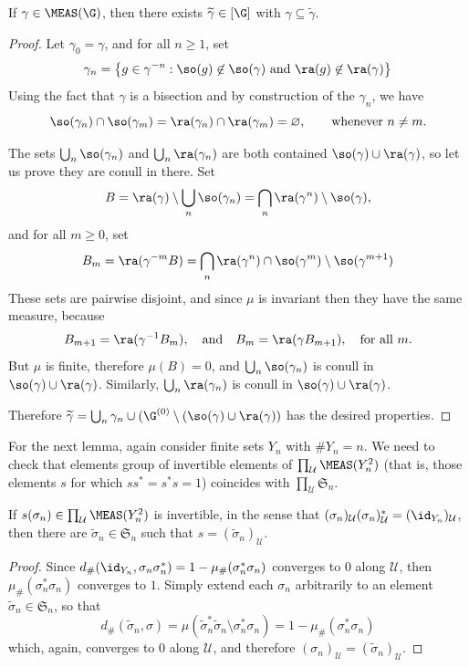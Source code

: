 \begin{lemma}\label{lemmaextensionfullsemigrouptofullgroup}
If $\gamma\in\MEAS(\G)$, then there exists $\widetilde{\gamma}\in[\G]$ with $\gamma\subseteq\widetilde{\gamma}$.
\end{lemma}
\begin{proof}
Let $\gamma_0=\gamma$, and for all $n\geq 1$, set
\[\gamma_n=\left\{g\in \gamma^{-n}:\so(g)\not\in \so(\gamma)\text{ and }\ra(g)\not\in \ra(\gamma)\right\}\]
Using the fact that $\gamma$ is a bisection and by construction of the $\gamma_n$, we have
\[\so(\gamma_n)\cap\so(\gamma_m)=\ra(\gamma_n)\cap\ra(\gamma_m)=\varnothing,\qquad\text{whenever }n\neq m.\]

The sets $\bigcup_n\so(\gamma_n)$ and $\bigcup_n\ra(\gamma_n)$ are both contained $\so(\gamma)\cup\ra(\gamma)$, so let us prove they are conull in there. Set
\[B=\ra(\gamma)\setminus \bigcup_n\so(\gamma_n)=\bigcap_n\ra(\gamma^n)\setminus\so(\gamma),\]
and for all $m\geq 0$, set
\[B_m=\ra(\gamma^{-m}B)=\bigcap_n\ra(\gamma^n)\cap\so(\gamma^m)\setminus\so(\gamma^{m+1})\]
These sets are pairwise disjoint, and since $\mu$ is invariant then they have the same measure, because
\[B_{m+1}=\ra(\gamma^{-1}B_m),\quad\text{and}\quad B_m=\ra(\gamma B_{m+1}),\quad\text{for all }m.\]
But $\mu$ is finite, therefore $\mu(B)=0$, and $\bigcup_n\so(\gamma_n)$ is conull in $\so(\gamma)\cup\ra(\gamma)$. Similarly, $\bigcup_n\ra(\gamma_n)$ is conull in $\so(\gamma)\cup\ra(\gamma)$. 

Therefore $\widetilde{\gamma}=\bigcup_n\gamma_n\cup(\G^{(0)}\setminus(\so(\gamma)\cup\ra(\gamma))$ has the desired properties.\qedhere
\end{proof}

For the next lemma, again consider finite sets $Y_n$ with $\#Y_n=n$. We need to check that elements group of invertible elements of $\prod_\mathcal{U}\MEAS(Y_n^2)$ (that is, those elements $s$ for which $ss^*=s^*s=1$) coincides with $\prod_\mathcal{U}\mathfrak{S}_n$.

\begin{lemma}
If $s(\sigma_n)\in\prod_\mathcal{U}\MEAS(Y_n^2)$ is invertible, in the sense that $(\sigma_n)_\mathcal{U}(\sigma_n)_{\mathcal{U}}^*=(\id_{Y_n})_{\mathcal{U}}$, then there are $\widetilde{\sigma}_n\in\mathfrak{S}_n$ such that $s=(\widetilde{\sigma}_n)_\mathcal{U}$.
\end{lemma}
\begin{proof}
Since $d_\#(\id_{Y_n},\sigma_n\sigma_n^*)=1-\mu_\#(\sigma_n^*\sigma_n)$ converges to $0$ along $\mathcal{U}$, then $\mu_\#(\sigma_n^*\sigma_n)$ converges to $1$. Simply extend each $\sigma_n$ arbitrarily to an element $\widetilde{\sigma}_n\in\mathfrak{S}_n$, so that
\[d_\#(\widetilde{\sigma}_n,\sigma)=\mu(\widetilde{\sigma}_n^*\widetilde{\sigma}_n\setminus\sigma_n^*\sigma_n)=1-\mu_\#(\sigma_n^*\sigma_n)\]
which, again, converges to $0$ along $\mathcal{U}$, and therefore $(\sigma_n)_\mathcal{U}=(\widetilde{\sigma}_n)_\mathcal{U}$.\qedhere
\end{proof}

